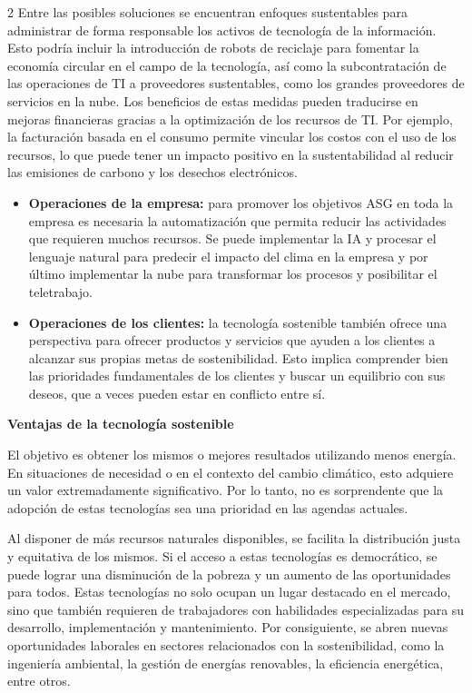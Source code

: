 \documentclass[12pt,spanish,Letterpaper,openany]{book}
\begin{document}
\begin {multicols}{2}
Entre las posibles soluciones se encuentran enfoques sustentables para administrar de forma responsable los activos de tecnología de la información. Esto podría incluir la introducción de robots de reciclaje para fomentar la economía circular en el campo de la tecnología, así como la subcontratación de las operaciones de TI a proveedores sustentables, como los grandes proveedores de servicios en la nube. Los beneficios de estas medidas pueden traducirse en mejoras financieras gracias a la optimización de los recursos de TI. Por ejemplo, la facturación basada en el consumo permite vincular los costos con el uso de los recursos, lo que puede tener un impacto positivo en la sustentabilidad al reducir las emisiones de carbono y los desechos electrónicos.

\begin{itemize}
\item
  \textbf{Operaciones de la empresa:} para promover los objetivos ASG en toda la empresa es necesaria la automatización que permita reducir las actividades que requieren muchos recursos. Se puede implementar la IA y procesar el lenguaje natural para predecir el impacto del clima en la empresa y por último implementar la nube para transformar los procesos y posibilitar el teletrabajo.
\item
  \textbf{Operaciones de los clientes:} la tecnología sostenible también ofrece una perspectiva para ofrecer productos y servicios que ayuden a los clientes a alcanzar sus propias metas de sostenibilidad. Esto implica comprender bien las prioridades fundamentales de los clientes y buscar un equilibrio con sus deseos, que a veces pueden estar en conflicto entre sí.
\end{itemize}

\textbf{Ventajas de la tecnología sostenible}

El objetivo es obtener los mismos o mejores resultados utilizando menos energía. En situaciones de necesidad o en el contexto del cambio climático, esto adquiere un valor extremadamente significativo. Por lo tanto, no es sorprendente que la adopción de estas tecnologías sea una prioridad en las agendas actuales.

\bigskip
\bigskip
\bigskip
\bigskip

Al disponer de más recursos naturales disponibles, se facilita la distribución justa y equitativa de los mismos. Si el acceso a estas tecnologías es democrático, se puede lograr una disminución de la pobreza y un aumento de las oportunidades para todos. Estas tecnologías no solo ocupan un lugar destacado en el mercado, sino que también requieren de trabajadores con habilidades especializadas para su desarrollo, implementación y mantenimiento. Por consiguiente, se abren nuevas oportunidades laborales en sectores relacionados con la sostenibilidad, como la ingeniería ambiental, la gestión de energías renovables, la eficiencia energética, entre otros.


\end{multicols}
\end{document}
